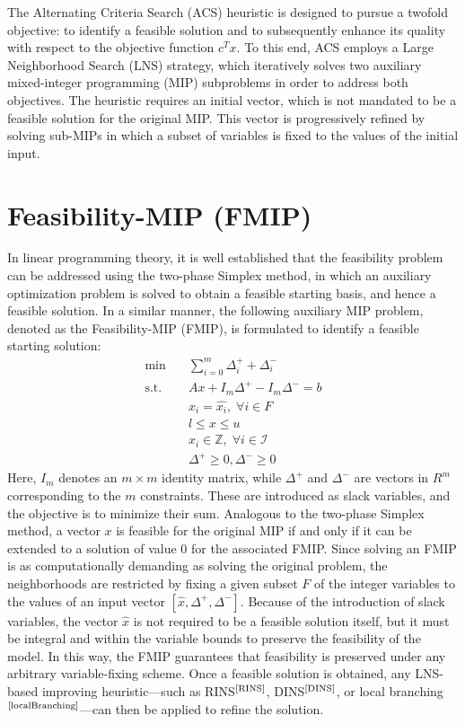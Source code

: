 The Alternating Criteria Search (ACS) heuristic is designed to pursue a twofold objective: to identify a feasible solution and to subsequently enhance its quality with respect to the objective function $c^T x$. To this end, ACS employs a Large Neighborhood Search (LNS) strategy, which iteratively solves two auxiliary mixed-integer programming (MIP) subproblems in order to address both objectives.
The heuristic requires an initial vector, which is not mandated to be a feasible solution for the original MIP. This vector is progressively refined by solving sub-MIPs in which a subset of variables is fixed to the values of the initial input.
\section{Feasibility-MIP (FMIP)}
In linear programming theory, it is well established that the feasibility problem can be addressed using the two-phase Simplex method, in which an auxiliary optimization problem is solved to obtain a feasible starting basis, and hence a feasible solution.
In a similar manner, the following auxiliary MIP problem, denoted as the Feasibility-MIP (FMIP), is formulated to identify a feasible starting solution:
\begin{align*}
\text{min} \quad & \sum_{i=0}^m \Delta_i^{+}+\Delta_i^{-} \\ \text{s.t.} \quad & Ax + I_m\Delta^+ - I_m\Delta^- =b\\ & x_i = \hat{x_i}, \; \forall i \in F\\ & l \le x \le u\\ & x_i \in \mathbb{Z}, \; \forall i \in \mathcal{I} \\ & \Delta^+ \ge 0, \Delta^- \ge 0 
\end{align*} 
Here, $I_m$ denotes an $m \times m$ identity matrix, while $\Delta^+$ and $\Delta^-$ are vectors in $R^m$ corresponding to the $m$ constraints. These are introduced as slack variables, and the objective is to minimize their sum. 
Analogous to the two-phase Simplex method, a vector $x$ is feasible for the original MIP if and only if it can be extended to a solution of value $0$ for the associated FMIP. Since solving an FMIP is as computationally demanding as solving the original problem, the neighborhoods are restricted by fixing a given subset $F$ of the integer variables to the values of an input vector $[\hat{x}, \Delta^+, \Delta^-]$. Because of the introduction of slack variables, the vector $\hat{x}$ is not required to be a feasible solution itself, but it must be integral and within the variable bounds to preserve the feasibility of the model. In this way, the FMIP guarantees that feasibility is preserved under any arbitrary variable-fixing scheme. Once a feasible solution is obtained, any LNS-based improving heuristic—such as RINS$^\text{\cite{RINS}}$, DINS$^\text{\cite{DINS}}$, or local branching$^\text{\cite{localBranching}}$—can then be applied to refine the solution.

